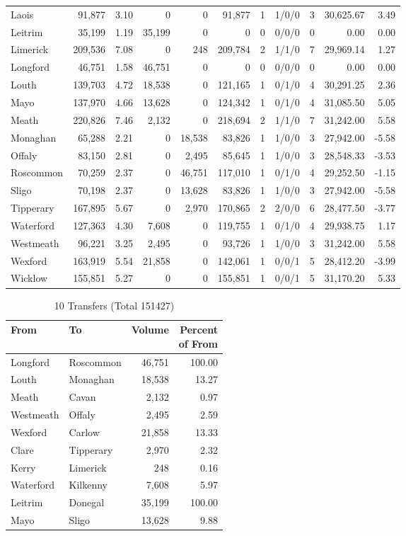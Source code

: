 \documentclass[a4paper]{article}
\begin{document}
\begin{longtable}{lrrrrrrlrrr}
Laois&91,877& 3.10&0&0&91,877&1&1/0/0&3&30,625.67& 3.49\\ 
Leitrim&35,199& 1.19&35,199&0&0&0&0/0/0&0& 0.00& 0.00\\ 
Limerick&209,536& 7.08&0&248&209,784&2&1/1/0&7&29,969.14& 1.27\\ 
Longford&46,751& 1.58&46,751&0&0&0&0/0/0&0& 0.00& 0.00\\ 
Louth&139,703& 4.72&18,538&0&121,165&1&0/1/0&4&30,291.25& 2.36\\ 
Mayo&137,970& 4.66&13,628&0&124,342&1&0/1/0&4&31,085.50& 5.05\\ 
Meath&220,826& 7.46&2,132&0&218,694&2&1/1/0&7&31,242.00& 5.58\\ 
Monaghan&65,288& 2.21&0&18,538&83,826&1&1/0/0&3&27,942.00&-5.58\\ 
Offaly&83,150& 2.81&0&2,495&85,645&1&1/0/0&3&28,548.33&-3.53\\ 
Roscommon&70,259& 2.37&0&46,751&117,010&1&0/1/0&4&29,252.50&-1.15\\ 
Sligo&70,198& 2.37&0&13,628&83,826&1&1/0/0&3&27,942.00&-5.58\\ 
Tipperary&167,895& 5.67&0&2,970&170,865&2&2/0/0&6&28,477.50&-3.77\\ 
Waterford&127,363& 4.30&7,608&0&119,755&1&0/1/0&4&29,938.75& 1.17\\ 
Westmeath&96,221& 3.25&2,495&0&93,726&1&1/0/0&3&31,242.00& 5.58\\ 
Wexford&163,919& 5.54&21,858&0&142,061&1&0/0/1&5&28,412.20&-3.99\\ 
Wicklow&155,851& 5.27&0&0&155,851&1&0/0/1&5&31,170.20& 5.33\\ 
\end{longtable}

\begin{table}[htbp]
\caption{10 Transfers (Total 151427)}
\centering
\begin{tabular}{llrr} \toprule
From &To &Volume &\shortstack{Percent\\of From} \\ \midrule
Longford&Roscommon&46,751&100.00\\ 
Louth&Monaghan&18,538&13.27\\ 
Meath&Cavan&2,132& 0.97\\ 
Westmeath&Offaly&2,495& 2.59\\ 
Wexford&Carlow&21,858&13.33\\ 
Clare&Tipperary&2,970& 2.32\\ 
Kerry&Limerick&248& 0.16\\ 
Waterford&Kilkenny&7,608& 5.97\\ 
Leitrim&Donegal&35,199&100.00\\ 
Mayo&Sligo&13,628& 9.88\\ 
\bottomrule
\end{tabular}
\end{table}
\end{document}
